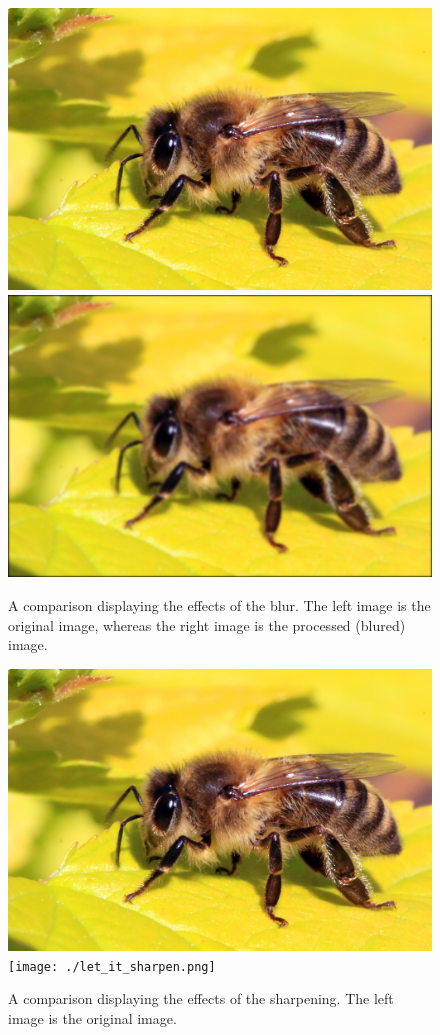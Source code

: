 \documentclass[a4paper, titlepage,12pt]{article}
\begin{document}
\begin{figure}[h!]
	\begin{center}
	\includegraphics[scale=0.065]{./let_it_bee.jpg}
	\includegraphics[scale=0.065]{./let_it_blur.png}
		\caption{A comparison displaying the effects of the blur. The left image is the original image, whereas the right image is the processed (blured) image.}
	\end{center}
\end{figure}

\begin{figure}[h!]
	\begin{center}
	\includegraphics[scale=0.065]{./let_it_bee.jpg}
	\texttt{[image: ./let\_it\_sharpen.png]}
		\caption{A comparison displaying the effects of the sharpening. The left image is the original image.}
	\end{center}
\end{figure}
\end{document}
